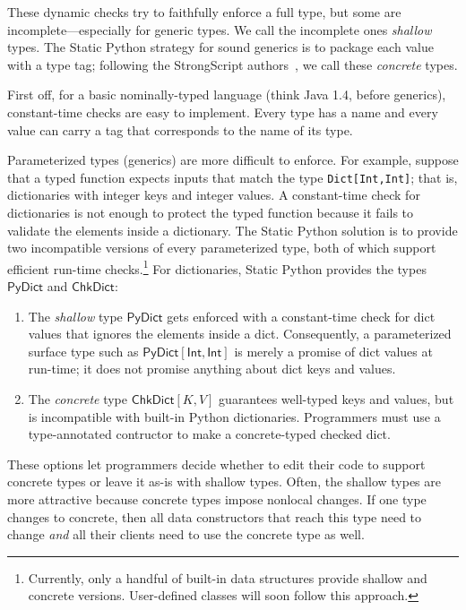 \documentclass[english,cleveref,submission]{programming}
\newcommand{\SP}{Static Python}
\newcommand{\code}[1]{\texttt{#1}}
\newcommand{\typefont}[1]{\mathsf{#1}}
\newcommand{\paramtype}[2]{#1[#2]}
\newcommand{\sptint}{\typefont{Int}}
\newcommand{\sptrawpydict}{\typefont{PyDict}}
\newcommand{\sptrawchkdict}{\typefont{ChkDict}} %
\newcommand{\sptpydict}[2]{\paramtype{\sptrawpydict}{#1, #2}}
\newcommand{\sptchkdict}[2]{\paramtype{\typefont{ChkDict}}{#1, #2}}
\begin{document}
These dynamic checks try to faithfully enforce a full type, but some are incomplete---especially
for generic types.
We call the incomplete ones \emph{shallow} types.
The \SP{} strategy for sound generics is to package each value with a type
tag; following the \textsf{StrongScript} authors~\cite{rzv-ecoop-2015}, we call
these \emph{concrete} types.

First off, for a basic nominally-typed language (think Java 1.4, before
generics), constant-time checks are easy to implement.
Every type has a name and every value can carry a tag that corresponds to the
name of its type.

Parameterized types (generics) are more difficult to enforce.
For example, suppose that a typed function expects inputs that match
the type \code{Dict[Int,Int]}; that is, dictionaries with integer keys and
integer values.
A constant-time check for dictionaries is not enough to protect the typed
function because it fails to validate the elements inside a dictionary.
The \SP{} solution is to provide two incompatible versions of every parameterized type,
both of which support efficient run-time checks.\footnote{Currently, only a handful of built-in data structures provide shallow
and concrete versions. User-defined classes will soon follow this approach.}
For dictionaries, \SP{} provides the types $\sptrawpydict$ and $\sptrawchkdict$:
\begin{enumerate}
  \item
    The \emph{shallow} type $\sptrawpydict$ gets enforced with a constant-time check
    for dict values that ignores the elements inside a dict.
    Consequently, a parameterized surface type such as $\sptpydict{\sptint}{\sptint}$
    is merely a promise of dict values at run-time; it does not promise anything about
    dict keys and values.
  \item
    The \emph{concrete} type $\sptchkdict{K}{V}$ guarantees well-typed
    keys and values, but is incompatible with built-in Python dictionaries.
    Programmers must use a type-annotated contructor to make a concrete-typed checked dict.
\end{enumerate}
%
These options let programmers decide whether to edit their code to support concrete types
or leave it as-is with shallow types.
Often, the shallow types are more attractive because concrete types impose
nonlocal changes.
If one type changes to concrete, then all data constructors that reach this type need
to change \emph{and} all their clients need to use the concrete type as well.
\end{document}
